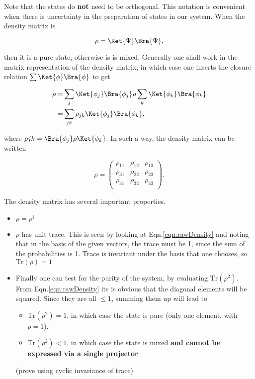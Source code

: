 \noindent   Note  that   the   states  do   \textbf{not}   need  to   be
orthogonal. This notation is convenient when there is uncertainty in the
preparation of states in our system. When the density matrix is

\begin{equation}
  \rho = \Ket{\Psi}\Bra{\Psi},
\end{equation}

\noindent then it is a pure  state, otherwise is is mixed. Generally one
shall work in the matrix representation  of the density matrix, in which
case one inserts the closure relation $\sum\Ket{\phi}\Bra{\phi}$ to get

\begin{equation}
  \begin{aligned}
    \rho = & \sum_j\Ket{\phi_j}\Bra{\phi_j}\rho\sum_k\Ket{\phi_k}\Bra{\phi_k}\\
    = & \sum_{jk}\rho_{jk} \Ket{\phi_j} \Bra{\phi_k},
  \end{aligned}
\end{equation}

\noindent where $\rho{jk}=\Bra{\phi_j}\rho\Ket{\phi_k}$.  In such a way,
the density matrix can be written

\begin{equation}
  \rho = \left( \begin{matrix}
      \rho_{11} & \rho_{12} & \rho_{13} \\
      \rho_{31} & \rho_{22} & \rho_{23} \\
      \rho_{31} & \rho_{32} & \rho_{33} \\
    \end{matrix}\right).
\end{equation}

\noindent The density matrix has several important properties.

\begin{itemize}
\item $\rho = \rho^{\dagger}$
\item   $\rho$  has   unit  trace.    This   is  seen   by  looking   at
  Eqn.\eqref{eqn:rawDensity} and noting  that in the basis  of the given
  vectors, the trace must be 1, since the sum of the probabilities is 1.
  Trace   is  invariant   under   the  basis   that   one  chooses,   so
  $\text{Tr}(\rho) = 1$
\item Finally one  can test for the purity of  the system, by evaluating
  $\text{Tr}(\rho^2)$.  From  Eqn.\eqref{eqn:rawDensity} its  is obvious
  that  the diagonal  elements  will  be squared.   Since  they are  all
  $\le1$, summing them up will lead to
  \begin{itemize}
  \item $\text{Tr}(\rho^2) =  1$, in which case the state  is pure (only
    one element, with $p=1$).
  \item  $\text{Tr}(\rho^2) <  1$,  in  which case  the  state is  mixed
    \textbf{and cannot be expressed via a single projector}
  \end{itemize}
  \textbf{} (prove
  using cyclic invariance of trace)
\end{itemize}

